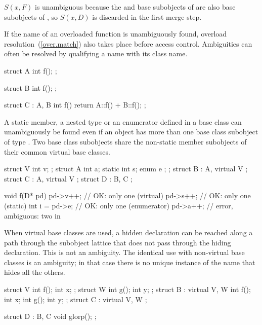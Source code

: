 $S(x,F)$ is unambiguous because the  and  base
subobjects of  are also base subobjects of , so
$S(x,D)$ is discarded in the first merge step.
\exitexample

\pnum
{}%
If the name of an overloaded function is unambiguously found,
overload resolution~(\ref{over.match}) also takes place before access
control.
%
%
%
Ambiguities can often be resolved by qualifying a name with its class name.
\enterexample
\begin{codeblock}
struct A {
  int f();
};

\end{codeblock}
\begin{codeblock}
struct B {
  int f();
};

\end{codeblock}
\begin{codeblock}
struct C : A, B {
  int f() { return A::f() + B::f(); }
};
\end{codeblock}
\exitexample

\pnum
\enternote
A static member, a nested type or an enumerator defined in a base class
 can unambiguously be found even if an object has more than one
base class subobject of type . Two base class subobjects share
the non-static member subobjects of their common virtual base classes.
\exitnote
\enterexample
\begin{codeblock}
struct V {
  int v;
};
struct A {
  int a;
  static int   s;
  enum { e };
};
struct B : A, virtual V { };
struct C : A, virtual V { };
struct D : B, C { };

void f(D* pd) {
  pd->v++;          // OK: only one  (virtual)
  pd->s++;          // OK: only one  (static)
  int i = pd->e;    // OK: only one  (enumerator)
  pd->a++;          // error, ambiguous: two  in 
}
\end{codeblock}
\exitexample

\pnum
\enternote
{}%
When virtual base classes are used, a hidden declaration can be reached
along a path through the subobject lattice that does not pass through
the hiding declaration. This is not an ambiguity. The identical use with
non-virtual base classes is an ambiguity; in that case there is no
unique instance of the name that hides all the others.
\exitnote
\enterexample
\begin{codeblock}
struct V { int f();  int x; };
struct W { int g();  int y; };
struct B : virtual V, W {
  int f();  int x;
  int g();  int y;
};
struct C : virtual V, W { };

struct D : B, C { void glorp(); };
\end{codeblock}

